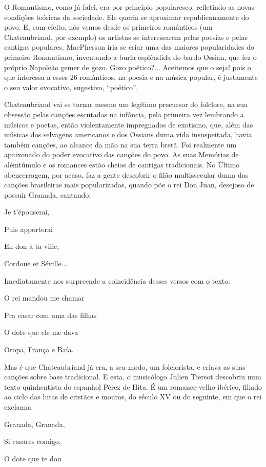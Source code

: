 O Romantismo, como já falei, era por princípio popularesco, refletindo
as novas condições teóricas da sociedade. Ele queria se aproximar
republicanamente do povo. E, com efeito, nós vemos desde os primeiros
românticos (um Chateaubriand, por exemplo) os artistas se interessarem
pelas poesias e pelas cantigas populares. MacPherson iria se criar uma
das maiores popularidades do primeiro Romantismo, inventando a burla
esplêndida do bardo Ossian, que fez o próprio Napoleão gemer de gozo.
Gozo poético?... Aceitemos que o seja! pois o que interessa a esses 26
românticos, na poesia e na música popular, é justamente o seu valor
evocativo, sugestivo, ``poético''.

Chateaubriand vai se tornar mesmo um legítimo precursor do folclore, na
sua obsessão pelas canções escutadas na infância, pela primeira vez
lembrando a músicos e poetas, então violentamente impregnados de
exotismo, que, além das músicas dos selvagens americanos e dos Ossians
duma vida insuspeitada, havia também canções, ao alcance da mão na sua
terra bretã. Foi realmente um apaixonado do poder evocativo das canções
do povo. As suas Memórias de alémtúmulo e os romances estão cheios de
cantigas tradicionais. No Último abencerragem, por acaso, faz a gente
descobrir o filão multissecular duma das canções brasileiras mais
popularizadas, quando põe o rei Don Juan, desejoso de possuir Granada,
cantando:

Je t'épouserai,

Puis apporterai

En don à ta ville,

Cordoue et Séville...

Imediatamente nos surpreende a coincidência desses versos com o texto:

O rei mandou me chamar

Pra casar com uma das filhas

O dote que ele me dava

Oropa, França e Baía.

Mas é que Chateaubriand já era, a seu modo, um folclorista, e criava as
suas canções sobre base tradicional. E esta, o musicólogo Julien Tiersot
descobriu num texto quinhentista do espanhol Pérez de Hita. É um
romance-velho ibérico, filiado ao ciclo das lutas de cristãos e mouros,
do século XV ou do seguinte, em que o rei exclama:

Granada, Granada,

Si casares comigo,

O dote que te dou


